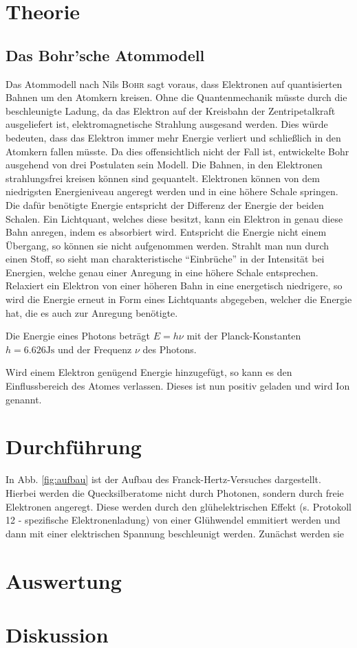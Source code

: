 \documentclass[12pt,a4paper,titlepage,headinclude,bibtotoc]{scrartcl}
\begin{document}
\section{Theorie}
\label{sec:theorie}
\subsection{Das Bohr'sche Atommodell}
Das Atommodell nach Nils \textsc{Bohr} sagt voraus, dass Elektronen auf quantisierten Bahnen um den Atomkern kreisen.
Ohne die Quantenmechanik müsste durch die beschleunigte Ladung, da das Elektron auf der Kreisbahn der Zentripetalkraft ausgeliefert ist, elektromagnetische Strahlung ausgesand werden.
Dies würde bedeuten, dass das Elektron immer mehr Energie verliert und schließlich in den Atomkern fallen müsste.
Da dies offensichtlich nicht der Fall ist, entwickelte Bohr ausgehend von drei Postulaten sein Modell.
Die Bahnen, in den Elektronen strahlungsfrei kreisen können sind gequantelt.
Elektronen können von dem niedrigsten Energieniveau angeregt werden und in eine höhere Schale springen.
Die dafür benötigte Energie entspricht der Differenz der Energie der beiden Schalen.
Ein Lichtquant, welches diese besitzt, kann ein Elektron in genau diese Bahn anregen, indem es absorbiert wird.
Entspricht die Energie nicht einem Übergang, so können sie nicht aufgenommen werden.
Strahlt man nun durch einen Stoff, so sieht man charakteristische "`Einbrüche"' in der Intensität bei Energien, welche genau einer Anregung in eine höhere Schale entsprechen.
Relaxiert ein Elektron von einer höheren Bahn in eine energetisch niedrigere, so wird die Energie erneut in Form eines Lichtquants abgegeben, welcher die Energie hat, die es auch zur Anregung benötigte.

Die Energie eines Photons beträgt $E=h\nu$ mit der Planck-Konstanten $h=6.626\si{\joule\second}$ und der Frequenz $\nu$ des Photons.

Wird einem Elektron genügend Energie hinzugefügt, so kann es den Einflussbereich des Atomes verlassen.
Dieses ist nun positiv geladen und wird Ion genannt.

                                                                                                                                                                      
\section{Durchführung}
\label{sec:durchfuehrung}
In Abb. \ref{fig:aufbau} ist der Aufbau des Franck-Hertz-Versuches dargestellt.
Hierbei werden die Quecksilberatome nicht durch Photonen, sondern durch freie Elektronen angeregt.
Diese werden durch den glühelektrischen Effekt (s. Protokoll 12 - spezifische Elektronenladung) von einer Glühwendel emmitiert werden und dann mit einer elektrischen Spannung beschleunigt werden.
Zunächst werden sie 

\section{Auswertung}
\label{sec:auswertung}

\section{Diskussion}
\label{sec:diskussion}



\end{document}
